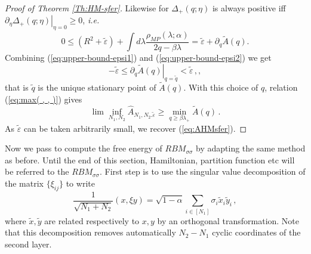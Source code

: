 \documentclass[10pt,oneside,a4paper,reqno]{amsart}  %
\def\be{\begin{equation}}
\def\ee{\end{equation}}
\def\ni{\noindent}
\def\ie{\textit{i.e. }}
\def\a{\alpha}
\def\e{\varepsilon}
\def\b{\beta}
\def\D{\Delta}
\def\l{\lambda}
\def\r{\rho}
\def\s{\sigma}
\theoremstyle{plain}
\numberwithin{equation}{section}
\begin{document}
\begin{proof}[Proof of Theorem \ref{Th:HM-sfer}]
\ni Likewise for $\D_+(q;\eta)$ is always positive iff 
$\left.\partial_\eta \D_+(q;\eta)\right|_{\eta=0}\geq0$, \ie
\be\label{eq:upper-bound-epsi2}
0\leq(R^2+\tilde\e)+\int d\l\frac{\r_{MP}(\l;\a)}{2q-\b\l}=\tilde \e+\partial_q \tilde A(q).
\ee
Combining (\ref{eq:upper-bound-epsi1}) and (\ref{eq:upper-bound-epsi2}) we get
$$
-\tilde\e\leq \left.\partial_q \tilde A(q)\right|_{q=\tilde q}<\tilde\e\,,,
$$
that is $\tilde q$ is the unique stationary point of $\tilde A(q)$. With this choice of $q$, relation (\ref{eq:max( , , )}) gives
\be
\lim\inf_{N_1,N_2} \widehat A_{N_1,N_2.\tilde \e}\geq \min_{q\geq\b\l_+}\tilde A(q) \,.
\ee
As $\tilde\e$ can be taken arbitrarily small, we recover (\ref{eq:AHMsfer}).
\end{proof}



Now we pass to compute the free energy of $RBM_{\s\s}$ by adapting the same method as before. Until the end of this section, Hamiltonian, partition function etc will be referred to the $RBM_{\s\s}$.
First step is to use the singular value decomposition of the matrix $\{\xi_{ij}\}$ to write
\be\label{eq:diagRBM}
\frac{1}{\sqrt{N_1+N_2}}(x,\xi y)=\sqrt{1-\a}\sum_{i\in[N_1]}\s_i\tilde x_i\tilde y_i\,,
\ee
where $\tilde x,\tilde y$ are related respectively to $x,y$ by an orthogonal transformation. Note that this decomposition removes automatically $N_2-N_1$ cyclic coordinates of the second layer. 
\end{document}
